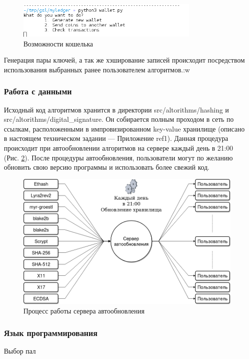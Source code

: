 \begin{figure}[h]
    \centering
    \includegraphics[width=0.8\textwidth]{images/wallet_run}
    \caption{Возможности кошелька}\label{wallet_run}
\end{figure}

Генерация пары ключей, а так же хэширование записей происходит посредством
использования выбранных ранее пользователем алгоритмов.:w

\subsubsection{Работа с данными}
Исходный код алгоритмов хранится в директории {\small src/altorithms/hashing} и
{\small src/altorithms/digital\_signature}. Он собирается полным проходом в
сеть по ссылкам, расположенными в импровизированном key-value хранилище
(описано в настоящем техническом задании --- Приложение ref1). Данная процедура
происходит при автообновлении алгоритмов на сервере каждый день в 21:00
(Рис. \ref{update}). После процедуры автообновления, пользователи могут по
желанию обновить свою версию программы и использовать более свежий код.

\begin{figure}[h]
    \centering
    \includegraphics[width=\textwidth]{images/server}
    \caption{Процесс работы сервера автообновления}\label{update}
\end{figure}


\subsubsection{Язык программирования}
Выбор пал
